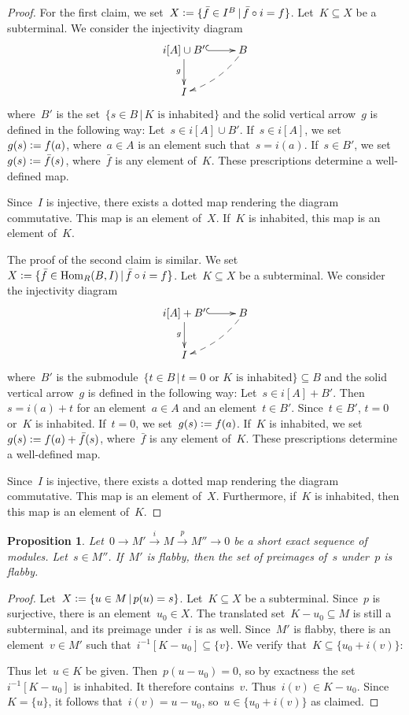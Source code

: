 \documentclass[oneside]{amsart}
\theoremstyle{definition}
\theoremstyle{plain}
\newtheorem{prop}[defn]{Proposition}
\theoremstyle{remark}
\newcommand{\xra}[1]{\xrightarrow{#1}}
\newcommand{\defeq}{\vcentcolon=}
\DeclareMathOperator{\Hom}{Hom}
\renewcommand{\_}{\mathpunct{.}\,}
\begin{document}
\begin{proof}For the first claim, we set~$X \defeq \{ \bar{f} \in I^B \,|\, \bar{f} \circ i =
f \}$. Let~$K \subseteq X$ be a subterminal. We consider the injectivity diagram
\[ \xymatrix{
  i[A] \cup B' \ar@{^{(}->}[r]\ar[d]_g & B \ar@{-->}@/^/[ld] \\
  I
} \]
where~$B'$ is the set~$\{ s \in B \,|\, \text{$K$ is inhabited} \}$ and the solid
vertical arrow~$g$ is defined in the following way: Let~$s \in i[A] \cup B'$.
If~$s \in i[A]$, we set~$g(s) \defeq f(a)$, where~$a \in A$ is an element such
that~$s = i(a)$. If~$s \in B'$, we set~$g(s) \defeq \bar{f}(s)$,
where~$\bar{f}$ is any element of~$K$. These prescriptions determine a well-defined
map.

Since~$I$ is injective, there exists a dotted map rendering the diagram
commutative. This map is an element of~$X$. If~$K$ is inhabited,
this map is an element of~$K$.

The proof of the second claim is similar. We
set~$X \defeq \{ \bar{f} \in \Hom_R(B,I) \,|\, \bar{f} \circ i =
f \}$. Let~$K \subseteq X$ be a subterminal. We consider the injectivity diagram
\[ \xymatrix{
  i[A] + B' \ar@{^{(}->}[r]\ar[d]_g & B \ar@{-->}@/^/[ld] \\
  I
} \]
where~$B'$ is the submodule~$\{ t \in B \,|\, \text{$t = 0$ or $K$ is
inhabited} \} \subseteq B$ and the solid vertical arrow~$g$ is defined in the following
way: Let~$s \in i[A] + B'$. Then~$s = i(a) + t$ for an element~$a \in A$ and an
element~$t \in B'$. Since~$t \in B'$, $t = 0$ or~$K$ is inhabited. If~$t = 0$,
we set~$g(s) \defeq f(a)$. If~$K$ is inhabited, we set~$g(s) \defeq f(a) +
\bar{f}(s)$, where~$\bar{f}$ is any element of~$K$. These prescriptions
determine a well-defined map.

Since~$I$ is injective, there exists a dotted map rendering the diagram
commutative. This map is an element of~$X$. Furthermore, if~$K$ is inhabited,
then this map is an element of~$K$.
\end{proof}

\begin{prop}\label{prop:set-of-preimages-flabby}
Let~$0 \to M' \xra{i} M \xra{p} M'' \to 0$ be a short exact
sequence of modules. Let~$s \in M''$. If~$M'$ is flabby, then the set of
preimages of~$s$ under~$p$ is flabby.
\end{prop}

\begin{proof}Let~$X \defeq \{ u \in M \,|\, p(u) = s
\}$. Let~$K \subseteq X$ be a subterminal. Since~$p$ is surjective, there is an
element~$u_0 \in X$. The translated set~$K - u_0 \subseteq M$ is still a
subterminal, and its preimage under~$i$ is as well. Since~$M'$ is flabby, there
is an element~$v \in M'$ such that~$i^{-1}[K - u_0] \subseteq \{v\}$. We verify
that~$K \subseteq \{u_0 + i(v)\}$:

Thus let~$u \in K$ be given. Then~$p(u - u_0) = 0$, so by exactness the
set~$i^{-1}[K - u_0]$ is inhabited. It therefore contains~$v$. Thus~$i(v) \in K
- u_0$. Since~$K = \{u\}$, it follows that~$i(v) = u - u_0$, so~$u \in \{u_0 +
i(v)\}$ as claimed.
\end{proof}
\end{document}
